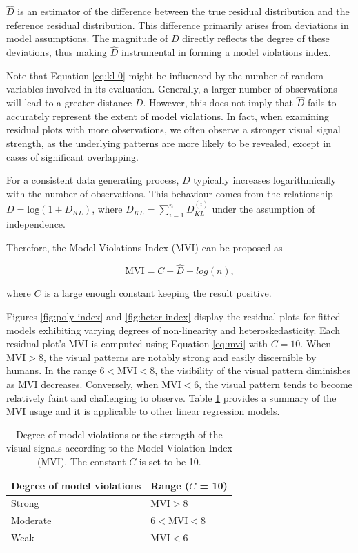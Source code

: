 \documentclass[]{interact}
\theoremstyle{plain}%
\theoremstyle{definition}
\theoremstyle{remark}
\begin{document}
\(\hat{D}\) is an estimator of the difference between the true residual
distribution and the reference residual distribution. This difference
primarily arises from deviations in model assumptions. The magnitude of
\(D\) directly reflects the degree of these deviations, thus making
\(\hat{D}\) instrumental in forming a model violations index.

Note that Equation \ref{eq:kl-0} might be influenced by the number of
random variables involved in its evaluation. Generally, a larger number
of observations will lead to a greater distance \(D\). However, this
does not imply that \(\hat{D}\) fails to accurately represent the extent
of model violations. In fact, when examining residual plots with more
observations, we often observe a stronger visual signal strength, as the
underlying patterns are more likely to be revealed, except in cases of
significant overlapping.

For a consistent data generating process, \(D\) typically increases
logarithmically with the number of observations. This behaviour comes
from the relationship \(D = \text{log}(1 + D_{KL})\), where
\(D_{KL} = \sum_{i=1}^{n}D_{KL}^{(i)}\) under the assumption of
independence.

Therefore, the Model Violations Index (MVI) can be proposed as

\begin{equation}
\label{eq:mvi}
\text{MVI} = C + \hat{D} - log(n),
\end{equation}

\noindent where \(C\) is a large enough constant keeping the result
positive.

Figures \ref{fig:poly-index} and \ref{fig:heter-index} display the
residual plots for fitted models exhibiting varying degrees of
non-linearity and heteroskedasticity. Each residual plot's MVI is
computed using Equation \ref{eq:mvi} with \(C = 10\). When
\(\text{MVI} > 8\), the visual patterns are notably strong and easily
discernible by humans. In the range \(6 < \text{MVI} < 8\), the
visibility of the visual pattern diminishes as MVI decreases.
Conversely, when \(\text{MVI} < 6\), the visual pattern tends to become
relatively faint and challenging to observe. Table \ref{tab:mvi}
provides a summary of the MVI usage and it is applicable to other linear
regression models.

\begin{table}

\caption{\label{tab:mvi}Degree of model violations or the strength of the visual signals according to the Model Violation Index (MVI). The constant $C$ is set to be 10.}
\centering
\begin{tabular}[t]{ll}
\toprule
Degree of model violations & Range ($C$ = 10)\\
\midrule
Strong & $\text{MVI} > 8$\\
Moderate & $6 < \text{MVI} < 8$\\
Weak & $\text{MVI} < 6$\\
\bottomrule
\end{tabular}
\end{table}
\end{document}
